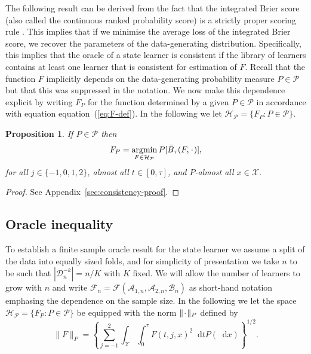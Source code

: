 \documentclass[a4paper,danish]{article}
\theoremstyle{plain} %
\numberwithin{theorem}{section}
\newtheorem{proposition}[theorem]{Proposition}
\theoremstyle{definition} %
\theoremstyle{remark}
\DeclareMathOperator{\E}{\mathbb{E}} %
\newcommand{\blank}{\makebox[1ex]{\textbf{$\cdot$}}}
\newcommand*\diff{\mathop{}\!\mathrm{d}}
\newcommand{\1}{\mathds{1}}
\DeclareMathOperator*{\argmin}{\arg\!\min}
\newcommand{\data}{\ensuremath{\mathcal{D}}}
\begin{document}
The following result can be derived from the fact
that the integrated Brier score (also called the continuous
ranked probability score) is a strictly proper scoring rule
\citep{gneiting2007strictly}. This implies that if we minimise
the average loss of the integrated Brier score, we recover the
parameters of the data-generating distribution. Specifically,
this implies that the oracle of a state learner is consistent
if the library of learners contains at least one learner that
is consistent for estimation of \( F \). Recall that the
function \(F\) implicitly depends on the data-generating
probability measure \(P\in\mathcal P\) but that this was
suppressed in the notation. We now make this dependence
explicit by writing \(F_P\) for the function determined by a
given \(P \in\mathcal{P}\) in accordance with equation
equation~(\ref{eq:F-def}). In the following we let
\( \mathcal{H}_{\mathcal{P}} = \{F_P : P \in \mathcal{P}\} \).

\begin{proposition}
  \label{prop:stric-prop}
  If \(P \in\mathcal{P}\) then
  \begin{equation*}
    F_P = \argmin_{F \in \mathcal{H}_{\mathcal{P}}} P{[\bar{B}_\tau(F, \blank)]},
  \end{equation*}
  for all \( j \in \{-1, 0, 1, 2 \} \), almost all
  \( t \in [0,\tau] \), and \( P \)-almost all
  \( x \in \mathcal{X} \).
\end{proposition}
\begin{proof}
  See Appendix~\ref{sec:consistency-proof}.
\end{proof}

\subsection{Oracle inequality}
\label{sec:finite-sample-oracle}

To establish a finite sample oracle result for the state learner we
assume a split of the data into equally sized folds, and for
simplicity of presentation we take \( n \) to be such that \(
|\data_n^{-k}| = n/K \) with \( K \) fixed. We will allow the number
of learners to grow with \( n \) and write \(
\mathcal{F}_n=\mathcal{F}(\mathcal{A}_{1,n}, \mathcal{A}_{2,n},
\mathcal{B}_n)\) as short-hand notation emphasing the
dependence on the sample size. In the following we let the space \(
\mathcal{H}_{\mathcal{P}}= \{F_P : P \in \mathcal{P}\} \) be equipped with the norm \( \| \blank
\|_{P} \) defined by
\begin{equation}
  \label{eq:norm}
  \| F \|_{P} = 
  \left\{
    \sum_{j=-1}^{2}\int_{\mathcal{X}} \int_0^{\tau} F(t, j, x)^2 \diff t P( \diff x)
  \right\}^{1/2}.
\end{equation}
\end{document}
